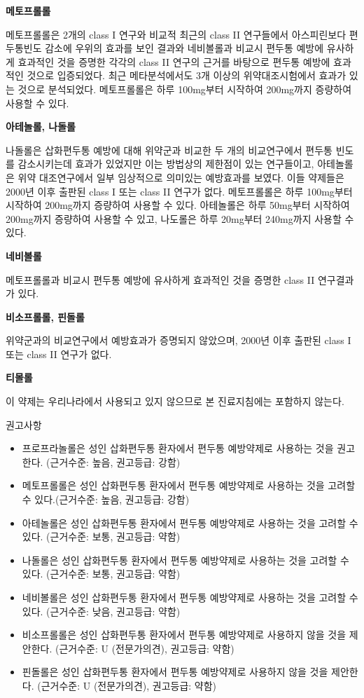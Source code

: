 \documentclass[]{book}
\begin{document}
\textbf{메토프롤롤}

메토프롤롤은 2개의 class I 연구와 비교적 최근의 class II 연구들에서 아스피린보다 편두통빈도 감소에 우위의 효과를 보인 결과와 네비볼롤과 비교시 편두통 예방에 유사하게 효과적인 것을 증명한 각각의 class II 연구의 근거를 바탕으로 편두통 예방에 효과적인 것으로 입증되었다. 최근 메타분석에서도 3개 이상의 위약대조시험에서 효과가 있는 것으로 분석되었다. 메토프롤롤은 하루 100mg부터 시작하여 200mg까지 증량하여 사용할 수 있다.

\textbf{아테놀롤, 나돌롤}

나돌롤은 삽화편두통 예방에 대해 위약군과 비교한 두 개의 비교연구에서 편두통 빈도를 감소시키는데 효과가 있었지만 이는 방법상의 제한점이 있는 연구들이고, 아테놀롤은 위약 대조연구에서 일부 임상적으로 의미있는 예방효과를 보였다. 이들 약제들은 2000년 이후 출판된 class I 또는 class II 연구가 없다. 메토프롤롤은 하루 100mg부터 시작하여 200mg까지 증량하여 사용할 수 있다. 아테놀롤은 하루 50mg부터 시작하여 200mg까지 증량하여 사용할 수 있고, 나도롤은 하루 20mg부터 240mg까지 사용할 수 있다.

\textbf{네비볼롤}

메토프롤롤과 비교시 편두통 예방에 유사하게 효과적인 것을 증명한 class II 연구결과가 있다.

\textbf{비소프롤롤, 핀돌롤}

위약군과의 비교연구에서 예방효과가 증명되지 않았으며, 2000년 이후 출판된 class I 또는 class II 연구가 없다.

\textbf{티몰롤}

이 약제는 우리나라에서 사용되고 있지 않으므로 본 진료지침에는 포함하지 않는다.

권고사항

\begin{itemize}
\item
  프로프라놀롤은 성인 삽화편두통 환자에서 편두통 예방약제로 사용하는 것을 권고한다. (근거수준: 높음, 권고등급: 강함)
\item
  메토프롤롤은 성인 삽화편두통 환자에서 편두통 예방약제로 사용하는 것을 고려할 수 있다.(근거수준: 높음, 권고등급: 강함)
\item
  아테놀롤은 성인 삽화편두통 환자에서 편두통 예방약제로 사용하는 것을 고려할 수 있다. (근거수준: 보통, 권고등급: 약함)
\item
  나돌롤은 성인 삽화편두통 환자에서 편두통 예방약제로 사용하는 것을 고려할 수 있다. (근거수준: 보통, 권고등급: 약함)
\item
  네비볼롤은 성인 삽화편두통 환자에서 편두통 예방약제로 사용하는 것을 고려할 수 있다. (근거수준: 낮음, 권고등급: 약함)
\item
  비소프롤롤은 성인 삽화편두통 환자에서 편두통 예방약제로 사용하지 않을 것을 제안한다. (근거수준: U (전문가의견), 권고등급: 약함)
\item
  핀돌롤은 성인 삽화편두통 환자에서 편두통 예방약제로 사용하지 않을 것을 제안한다. (근거수준: U (전문가의견), 권고등급: 약함)
\end{itemize}
\end{document}
